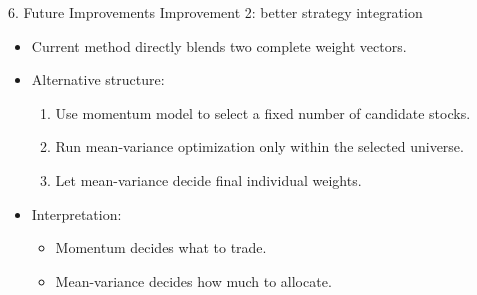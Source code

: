 \documentclass[aspectratio=169]{beamer}
\begin{document}
\begin{frame}{6. Future Improvements}
  Improvement 2: better strategy integration
  \begin{itemize}
    \item Current method directly blends two complete weight vectors.
    \item Alternative structure:
    \begin{enumerate}
      \item Use momentum model to select a fixed number of candidate stocks.
      \item Run mean-variance optimization only within the selected universe.
      \item Let mean-variance decide final individual weights.
    \end{enumerate}
    \item Interpretation:
    \begin{itemize}
      \item Momentum decides what to trade.
      \item Mean-variance decides how much to allocate.
    \end{itemize}
  \end{itemize}
\end{frame}
\end{document}
